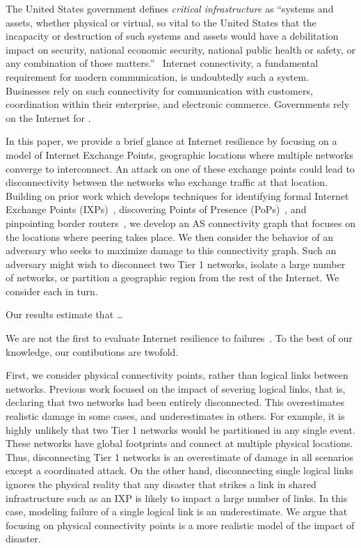 The United States government defines {\it critical infrastructure} as ``systems
and assets, whether physical or virtual, so vital to the United States that the
incapacity or destruction of such systems and assets would have a debilitation
impact on security, national economic security, national public health or
safety, or any combination of those matters.''~\cite{patriotact} Internet
connectivity, a fundamental requirement for modern communication, is
undoubtedly such a system.  Businesses rely on such connectivity for
communication with customers, coordination within their enterprise, and
electronic commerce.  Governments rely on the Internet for .

In this paper, we provide a brief glance at Internet resilience by focusing on
a model of Internet Exchange Points, geographic locations where multiple
networks converge to interconnect.  An attack on one of these exchange points
could lead to disconnectivity between the networks who exchange traffic at that
location.  Building on prior work which develops techniques for identifying
formal Internet Exchange Points (IXPs)~\cite{ixps-mapped}, discovering Points
of Presence (PoPs)~\cite{iplane}, and pinpointing border
routers~\cite{asbrsomething}, we develop an AS connectivity graph that focuses
on the locations where peering takes place.  We then consider the behavior of
an adversary who seeks to maximize damage to this connectivity graph.  Such an
adversary might wish to disconnect two Tier 1 networks, isolate a large number
of networks, or partition a geographic region from the rest of the Internet.
We consider each in turn.

Our results estimate that \ldots

We are not the first to evaluate Internet resilience to
failures~\cite{michigan, probablymore}.  To the best of our knowledge, our
contibutions are twofold.

First, we consider physical connectivity points, rather than logical links
between networks.  Previous work focused on the impact of severing logical
links, that is, declaring that two networks had been entirely disconnected.
This overestimates realistic damage in some cases, and underestimates in
others.  For example, it is highly unlikely that two Tier 1 networks would be
partitioned in any single event.  These networks have global footprints and
connect at multiple physical locations.  Thus, disconnecting Tier 1 networks is
an overestimate of damage in all scenarios except a coordinated attack.  On the
other hand, disconnecting single logical links ignores the physical reality
that any disaster that strikes a link in shared infrastructure such as an IXP
is likely to impact a large number of links.  In this case, modeling failure of
a single logical link is an underestimate.  We argue that focusing on physical
connectivity points is a more realistic model of the impact of disaster. 
 
